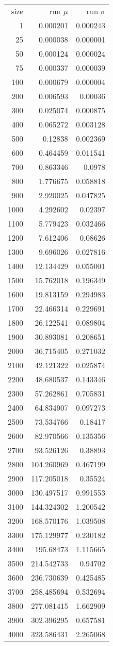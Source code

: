 \begin{longtable}{r r r}
size & run $\mu$ & run $\sigma$ \\
1 & 0.000201 & 0.000243 \\
25 & 0.000038 & 0.000001 \\
50 & 0.000124 & 0.000024 \\
75 & 0.000337 & 0.000039 \\
100 & 0.000679 & 0.000004 \\
200 & 0.006593 & 0.00036 \\
300 & 0.025074 & 0.000875 \\
400 & 0.065272 & 0.003128 \\
500 & 0.12838 & 0.002369 \\
600 & 0.464459 & 0.011541 \\
700 & 0.863346 & 0.0978 \\
800 & 1.776675 & 0.058818 \\
900 & 2.920025 & 0.047825 \\
1000 & 4.292602 & 0.02397 \\
1100 & 5.779423 & 0.032466 \\
1200 & 7.612406 & 0.08626 \\
1300 & 9.696026 & 0.027816 \\
1400 & 12.134429 & 0.055001 \\
1500 & 15.762018 & 0.196349 \\
1600 & 19.813159 & 0.294983 \\
1700 & 22.466314 & 0.229691 \\
1800 & 26.122541 & 0.089804 \\
1900 & 30.893081 & 0.208651 \\
2000 & 36.715405 & 0.271032 \\
2100 & 42.121322 & 0.025874 \\
2200 & 48.680537 & 0.143346 \\
2300 & 57.262861 & 0.705831 \\
2400 & 64.834907 & 0.097273 \\
2500 & 73.534766 & 0.18417 \\
2600 & 82.970566 & 0.135356 \\
2700 & 93.526126 & 0.38893 \\
2800 & 104.260969 & 0.467199 \\
2900 & 117.205018 & 0.35524 \\
3000 & 130.497517 & 0.991553 \\
3100 & 144.324302 & 1.200542 \\
3200 & 168.570176 & 1.039508 \\
3300 & 175.129977 & 0.230182 \\
3400 & 195.68473 & 1.115665 \\
3500 & 214.542733 & 0.94702 \\
3600 & 236.730639 & 0.425485 \\
3700 & 258.485694 & 0.532694 \\
3800 & 277.081415 & 1.662909 \\
3900 & 302.396295 & 0.657581 \\
4000 & 323.586431 & 2.265068 \\
\end{longtable}

